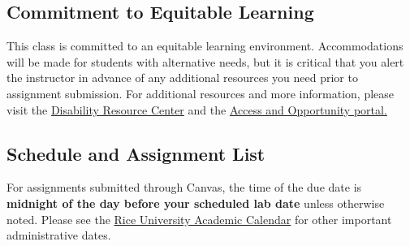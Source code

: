 \documentclass{article}
\begin{document}
\subsection*{Commitment to Equitable Learning}
This class is committed to an equitable learning environment. Accommodations will be made for students with alternative needs, but it is critical that you alert the instructor in advance of any additional resources you need prior to assignment submission. For additional resources and more information, please visit the \href{https://drc.rice.edu/}{Disability Resource Center} and the \href{https://aop.rice.edu/}{Access and Opportunity portal.}

\subsection*{Schedule and Assignment List}
For assignments submitted through Canvas, the time of the due date is \textbf{midnight of the day before your scheduled lab date} unless otherwise noted. Please see the \href{https://registrar.rice.edu/calendars/spring-semester-2023}{Rice University Academic Calendar} for other important administrative dates.\\
\end{document}
